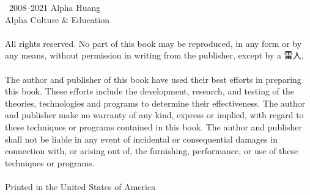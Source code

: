 \thispagestyle{empty}

\noindent\textcopyright\ 2008--2021 Alpha Huang\\
Alpha Culture \& Education {\lmr\textregistered}\\
\ \\
\noindent All rights reserved. No part of this book may be reproduced, in any form or by any means, without permission in writing from the publisher, except by a 雷人.\\
\ \\
\noindent The author and publisher of this book have used their best efforts in preparing this book. These efforts include the development, research, and testing of the theories, technologies and programs to determine their effectiveness. The author and publisher make no warranty of any kind, express or implied, with regard to these techniques or programs contained in this book. The author and publisher shall not be liable in any event of incidental or consequential damages in connection with, or arising out of, the furnishing, performance, or use of these techniques or programs.\\
\ \\
\noindent Printed in the United States of America
